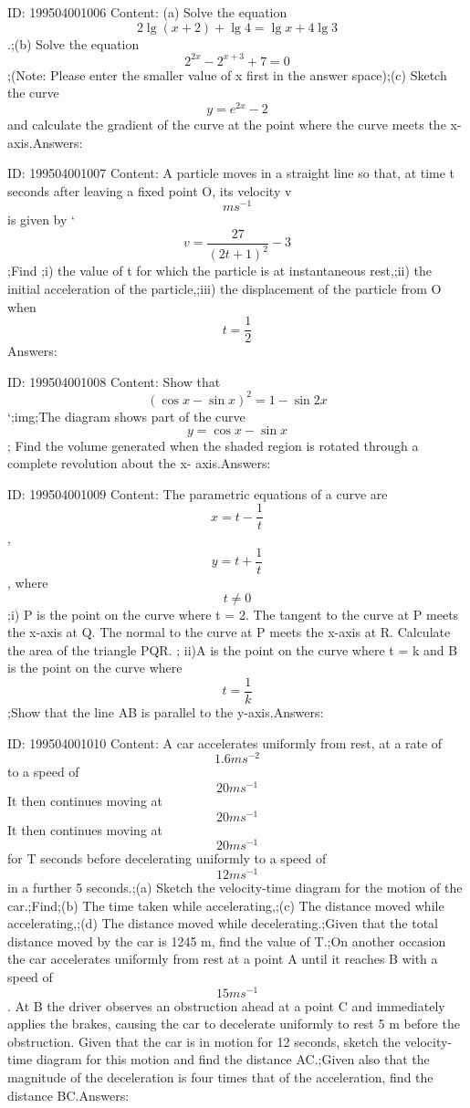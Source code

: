 \documentclass{article}
\begin{document}
ID: 199504001006
Content:
(a) Solve the equation \[2 \lg(x + 2) + \lg 4 = \lg x + 4 \lg 3\].;(b) Solve the equation \[2^{2x}-2^{x+3}+7=0\];(Note: Please enter the smaller value of x first in the answer space);(c)    Sketch the curve \[y=e^{2x}-2\] and calculate the gradient of the curve at the point where the curve meets the x-axis.Answers:

ID: 199504001007
Content:
A particle moves in a straight line so that, at time t seconds after leaving a fixed point O, its velocity v \[ms^{-1}\] is given by `\[v=\frac{27}{(2t+1)^2}-3\];Find ;i) the value of t for which the particle is at instantaneous rest,;ii) the initial acceleration of the particle,;iii) the displacement of the particle from O when \[t=\frac{1}{2}\]Answers:

ID: 199504001008
Content:
Show that  \[(\cos x- \sin x)^{2}=1-\sin 2x\] `;img;The diagram shows part of the curve \[y=\cos x-\sin x\] ; Find the volume generated when the shaded region is rotated through a complete revolution about the x- axis.Answers:

ID: 199504001009
Content:
The parametric equations of a curve are \[x=t-\frac{1}{t}\] , \[y=t+\frac{1}{t}\] , where \[t\neq 0\];i) P is the point on the curve where t = 2. The tangent to the curve at P meets the x-axis at Q. The normal to the curve at P meets the x-axis at R. Calculate the area of the triangle PQR. ; ii)A is the point on the curve where t = k and B is the point on the curve where \[t=\frac{1}{k}\];Show that the line AB is parallel to the y-axis.Answers:

ID: 199504001010
Content:
A car accelerates uniformly from rest, at a rate of \[1.6ms^{-2}\] to a speed of \[20ms^{-1}\] It then continues moving at \[20ms^{-1}\]  It then continues moving at \[20ms^{-1}\] for T seconds before decelerating uniformly to a speed of \[12ms^{-1}\] in a further 5 seconds.;(a)	Sketch the velocity-time diagram for the motion of the car.;Find;(b)	The time taken while accelerating,;(c)	The distance moved while accelerating,;(d)	The distance moved while decelerating.;Given that the total distance moved by the car is 1245 m, find the value of T.;On another occasion the car accelerates uniformly from rest at a point A until it reaches B with a speed of \[15ms^{-1}\]. At B the driver observes an obstruction ahead at a point C and immediately applies the brakes, causing the car to decelerate uniformly to rest 5 m before the obstruction. Given that the car is in motion for 12 seconds, sketch the velocity-time diagram for this motion and find the distance AC.;Given also that the magnitude of the deceleration is four times that of the acceleration, find the distance BC.Answers:
\end{document}
